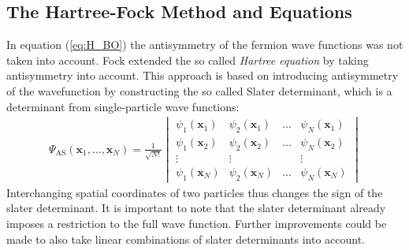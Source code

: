 \documentclass[twoside,        %
			   11pt,			%
               BCOR10mm,       %
               ngerman,english  %
               ]{scrartcl}
\begin{document}
\subsection{The Hartree-Fock Method and Equations}
In equation (\ref{eq:H_BO}) the antisymmetry of the fermion wave functions was not taken into account. Fock extended the so called \textit{Hartree equation} by taking antisymmetry into account. This approach is based on introducing antisymmetry of the wavefunction by constructing the so called Slater determinant, which is a determinant from single-particle wave functions:
\begin{align*}
\Psi_\text{AS}(\mathbf{x}_1, \dots, \mathbf{x}_N) = \frac{1}{\sqrt{N!}}
\begin{vmatrix}
\psi_1(\mathbf{x}_1) &\psi_2(\mathbf{x}_1)& \dots &\psi_N (\mathbf{x}_1) \\
\psi_1(\mathbf{x}_2) &\psi_2(\mathbf{x}_2)& \dots &\psi_N (\mathbf{x}_2) \\
\vdots & \vdots & & \vdots \\
\psi_1(\mathbf{x}_N)& \psi_2(\mathbf{x}_N)& \dots& \psi_N (\mathbf{x}_N)
\end{vmatrix}
\end{align*} 
Interchanging spatial coordinates of two particles thus changes the sign of the slater determinant. It is important to note that the slater determinant already imposes a restriction to the full wave function. Further improvements could be made to also take linear combinations of slater determinants into account.
\end{document}
